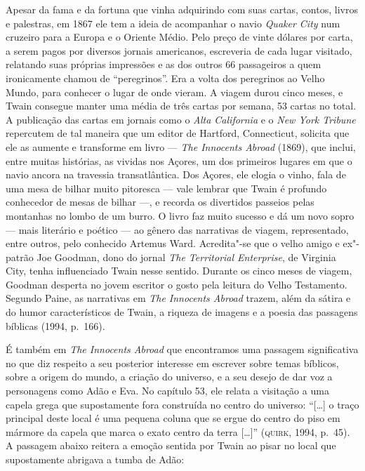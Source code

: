 Apesar da fama e da fortuna que vinha adquirindo com suas cartas, contos,
livros e palestras, em 1867 ele tem a ideia de acompanhar o navio \textit{Quaker City}
num cruzeiro para a Europa e o Oriente Médio. Pelo preço de vinte dólares
por carta, a serem pagos por diversos jornais americanos, escreveria de
cada lugar visitado, relatando suas próprias impressões e as dos outros 66 passageiros 
a quem ironicamente chamou de ``peregrinos''. Era
a volta dos peregrinos ao Velho Mundo, para conhecer o lugar de onde vieram. A
viagem durou cinco meses, e Twain consegue manter uma média de três cartas
por semana, 53 cartas no total. A publicação das cartas em
jornais como o \textit{Alta California} e o \textit{New York Tribune} repercutem de tal
maneira que um editor de Hartford, Connecticut, solicita que ele as aumente e
transforme em livro --- \textit{The Innocents Abroad} (1869), que inclui,
entre muitas histórias, as vividas nos Açores, um dos primeiros
lugares em que o navio ancora na travessia transatlântica. Dos Açores, ele elogia o
vinho, fala de uma mesa de bilhar muito pitoresca --- vale lembrar que Twain é
profundo conhecedor de mesas de bilhar ---, e recorda os divertidos passeios
pelas montanhas no lombo de um burro. O livro faz muito sucesso e dá um
novo sopro --- mais literário e poético --- ao gênero das narrativas de viagem,
representado, entre outros, pelo conhecido Artemus
Ward. Acredita"-se que o velho amigo e ex"-patrão Joe Goodman, dono do
jornal \textit{The Territorial Enterprise}, de Virginia City, tenha
influenciado Twain nesse sentido. Durante os cinco meses de viagem, Goodman
desperta no jovem escritor o gosto pela leitura do Velho Testamento. Segundo Paine,
as narrativas em \textit{The Innocents Abroad} trazem, além da sátira e do
humor característicos de Twain, a riqueza de imagens e a poesia das
passagens bíblicas (1994, p.~166).

É também em \textit{The Innocents Abroad} que encontramos uma passagem significativa
no que diz respeito a seu posterior interesse em escrever sobre temas
bíblicos, sobre a origem do mundo, a criação do universo, e a seu desejo de
dar voz a personagens como Adão e Eva. No capítulo 53, ele relata a visitação
a uma capela grega que supostamente fora construída no centro do universo:
“[\ldots{}] o traço principal deste local é uma pequena coluna que se ergue do
centro do piso em mármore da capela que marca o exato centro da terra
[\ldots{}]” (\textsc{quirk}, 1994, p.~45). A passagem abaixo reitera a emoção sentida
por Twain ao pisar no local que supostamente abrigava a tumba de Adão:

